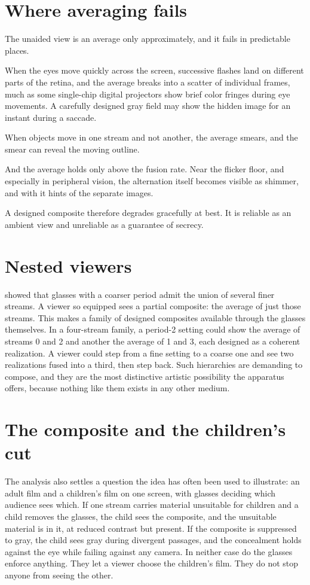 \section{Where averaging fails}

The unaided view is an average only approximately, and it fails in predictable places.

When the eyes move quickly across the screen, successive flashes land on different parts of the retina, and the average breaks into a scatter of individual frames, much as some single-chip digital projectors show brief color fringes during eye movements. A carefully designed gray field may show the hidden image for an instant during a saccade.

When objects move in one stream and not another, the average smears, and the smear can reveal the moving outline.

And the average holds only above the fusion rate. Near the flicker floor, and especially in peripheral vision, the alternation itself becomes visible as shimmer, and with it hints of the separate images.

A designed composite therefore degrades gracefully at best. It is reliable as an ambient view and unreliable as a guarantee of secrecy.

\section{Nested viewers}

 showed that glasses with a coarser period admit the union of several finer streams. A viewer so equipped sees a partial composite: the average of just those streams. This makes a family of designed composites available through the glasses themselves. In a four-stream family, a period-2 setting could show the average of streams 0 and 2 and another the average of 1 and 3, each designed as a coherent realization. A viewer could step from a fine setting to a coarse one and see two realizations fused into a third, then step back. Such hierarchies are demanding to compose, and they are the most distinctive artistic possibility the apparatus offers, because nothing like them exists in any other medium.

\section{The composite and the children's cut}

The analysis also settles a question the idea has often been used to illustrate: an adult film and a children's film on one screen, with glasses deciding which audience sees which. If one stream carries material unsuitable for children and a child removes the glasses, the child sees the composite, and the unsuitable material is in it, at reduced contrast but present. If the composite is suppressed to gray, the child sees gray during divergent passages, and the concealment holds against the eye while failing against any camera. In neither case do the glasses enforce anything. They let a viewer choose the children's film. They do not stop anyone from seeing the other.

